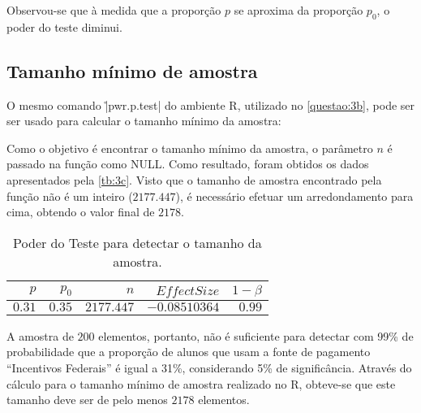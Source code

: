 Observou-se que à medida que a proporção $p$ se aproxima da proporção $p_0$, o poder do teste diminui.


\subsection{Tamanho mínimo de amostra}
\label{questao:3c}
O mesmo comando \r|pwr.p.test| do ambiente R, utilizado no \autoref{questao:3b}, pode ser ser usado para calcular o tamanho mínimo da amostra: 


Como o objetivo é encontrar o tamanho mínimo da amostra, o parâmetro $n$ é passado na função como NULL.
Como resultado, foram obtidos os dados apresentados pela \autoref{tb:3c}. 
Visto que o tamanho de amostra encontrado pela função não é um inteiro ($2177.447$), é necessário efetuar um arredondamento para cima, obtendo o valor final de $2178$.

\begin{table}[ht]
\centering
\caption{Poder do Teste para detectar o tamanho da amostra.} 
\label{tb:3c}
\begin{tabular}{rrrrr}
  \toprule
 $p$ & $p_0$ & $n$ & $Effect Size$ & $1 - \beta$ \\ 
  \midrule
  $0.31$ & $0.35$ & $2177.447$ & $-0.08510364$ & $0.99$ \\ 
   \bottomrule
\end{tabular}
\end{table}

A amostra de $200$ elementos, portanto, não é suficiente para detectar com 99\% de probabilidade que a proporção
de alunos que usam a fonte de pagamento ``Incentivos Federais'' é igual a 31\%, considerando 5\% de significância.
Através do cálculo para o tamanho mínimo de amostra realizado no R, 
obteve-se que este tamanho deve ser de pelo menos $2178$ elementos.
